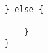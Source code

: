 \begin{landscape}
\begin{multicols}{2}
\begin{lstlisting}[firstnumber=2759]
	} else {
		
	}
}
\end{lstlisting}

\end{multicols}
\end{landscape}